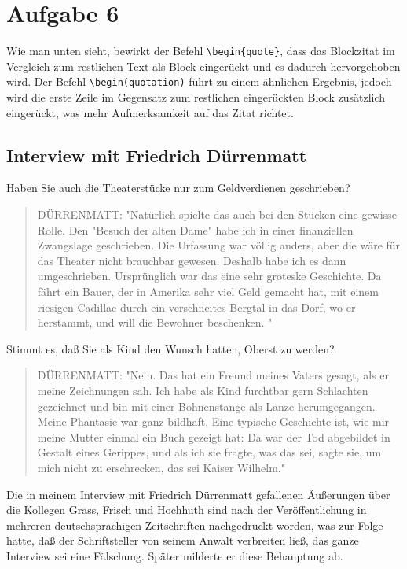 \documentclass[a4 paper]{article}
\begin{document}
\section{Aufgabe 6}

    Wie man unten sieht, bewirkt der Befehl \verb+\begin{quote}+, dass das Blockzitat im Vergleich zum restlichen Text als Block eingerückt und es dadurch hervorgehoben wird. 
    Der Befehl \verb+\begin(quotation)+ führt zu einem ähnlichen Ergebnis, jedoch wird die erste Zeile im Gegensatz zum restlichen eingerückten Block zusätzlich eingerückt, was mehr Aufmerksamkeit auf das Zitat richtet. 

\subsection{Interview mit Friedrich Dürrenmatt}

    Haben Sie auch die Theaterstücke nur zum Geldverdienen geschrieben?
     
    \begin{quote} 
         DÜRRENMATT: "Natürlich spielte das auch bei den Stücken eine gewisse Rolle. Den "Besuch der alten Dame" habe ich in einer finanziellen Zwangslage geschrieben. Die Urfassung war völlig anders, aber die wäre für das Theater nicht brauchbar gewesen. Deshalb habe ich es dann umgeschrieben. Ursprünglich war das eine sehr groteske Geschichte. Da fährt ein Bauer, der in Amerika sehr viel Geld gemacht hat, mit einem riesigen Cadillac durch ein verschneites Bergtal in das Dorf, wo er herstammt, und will die Bewohner beschenken. " 
    \end{quote}

    Stimmt es, daß Sie als Kind den Wunsch hatten, Oberst zu werden?
    
    \begin{quotation}
         DÜRRENMATT: "Nein. Das hat ein Freund meines Vaters gesagt, als er meine Zeichnungen sah. Ich habe als Kind furchtbar gern Schlachten gezeichnet und bin mit einer Bohnenstange als Lanze herumgegangen. Meine Phantasie war ganz bildhaft. Eine typische Geschichte ist, wie mir meine Mutter einmal ein Buch gezeigt hat: Da war der Tod abgebildet in Gestalt eines Gerippes, und als ich sie fragte, was das sei, sagte sie, um mich nicht zu erschrecken, das sei Kaiser Wilhelm." 
    \end{quotation}
    
    Die in meinem Interview mit Friedrich Dürrenmatt gefallenen Äußerungen über die Kollegen Grass, Frisch und Hochhuth sind nach der Veröffentlichung in mehreren deutschsprachigen Zeitschriften nachgedruckt worden, was zur Folge hatte, daß der Schriftsteller von seinem Anwalt verbreiten ließ, das ganze Interview sei eine Fälschung. Später milderte er diese Behauptung ab. 
     
\end{document}
